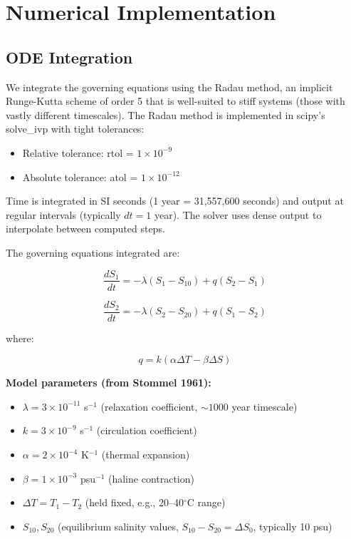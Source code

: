 \documentclass[12pt,letterpaper]{article}
\begin{document}
\section{Numerical Implementation}

\subsection{ODE Integration}

We integrate the governing equations using the Radau method, an implicit Runge-Kutta scheme of order 5 that is well-suited to stiff systems (those with vastly different timescales). The Radau method is implemented in scipy's solve\_ivp with tight tolerances:

\begin{itemize}
\item Relative tolerance: rtol = $1 \times 10^{-9}$
\item Absolute tolerance: atol = $1 \times 10^{-12}$
\end{itemize}

Time is integrated in SI seconds (1 year = 31,557,600 seconds) and output at regular intervals (typically $dt = 1$ year). The solver uses dense output to interpolate between computed steps.

The governing equations integrated are:

\begin{equation}
\frac{dS_1}{dt} = -\lambda(S_1 - S_{10}) + q(S_2 - S_1)
\end{equation}

\begin{equation}
\frac{dS_2}{dt} = -\lambda(S_2 - S_{20}) + q(S_1 - S_2)
\end{equation}

where:

\begin{equation}
q = k(\alpha\Delta T - \beta\Delta S)
\end{equation}

\noindent \textbf{Model parameters (from Stommel 1961):}
\begin{itemize}
\item $\lambda = 3 \times 10^{-11}$ s$^{-1}$ (relaxation coefficient, $\sim 1000$ year timescale)
\item $k = 3 \times 10^{-9}$ s$^{-1}$ (circulation coefficient)
\item $\alpha = 2 \times 10^{-4}$ K$^{-1}$ (thermal expansion)
\item $\beta = 1 \times 10^{-3}$ psu$^{-1}$ (haline contraction)
\item $\Delta T = T_1 - T_2$ (held fixed, e.g., 20--40$^\circ$C range)
\item $S_{10}, S_{20}$ (equilibrium salinity values, $S_{10} - S_{20} = \Delta S_0$, typically 10 psu)
\end{itemize}
\end{document}
